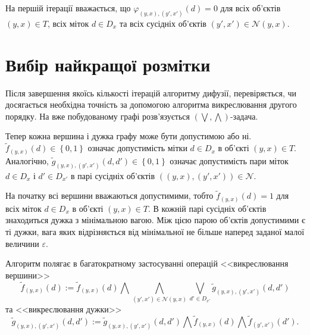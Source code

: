 На першій ітерації вважається, що
$\varphi_{\left(y, x \right), \left(y', x' \right)} \left(d \right) = 0$
для всіх об'єктів $\left(y, x \right) \in T$, всіх міток $d \in D_x$
та всіх сусідніх об'єктів
$\left(y', x' \right) \in \mathcal{N} \left(y, x \right)$.

\section{Вибір найкращої розмітки}


Після завершення якоїсь кількості ітерацій алгоритму дифузії,
перевіряється, чи досягається необхідна точність за допомогою
алгоритма викреслювання другого порядку.
На вже побудованому графі розв'язується
$\left( \bigvee, \bigwedge \right)$-задача.


Тепер кожна вершина і дужка графу може бути допустимою або ні.
$\tilde{f}_{\left(y, x \right)} \left(d \right) \in \left\{ 0, 1 \right\}$
означає допустимість мітки
$d \in D_x$ в об'єкті $\left(y,x \right) \in T$.
Аналогічно,
$\tilde{g}_{\left(y,x \right), \left(y', x' \right)} \left(d, d' \right)
    \in \left\{ 0, 1 \right\}$
означає допустимість пари міток $d \in D_x$ і $d' \in D_{x'}$
в парі сусідніх об'єктів
$\left( \left(y,x \right), \left(y', x' \right) \right) \in \mathcal{N}$.

На початку всі вершини вважаються допустимими, тобто
$\tilde{f}_{\left(y, x \right)} \left(d \right) = 1$ для всіх
міток $d \in D_x$ в об'єкті $\left(y,x \right) \in T$.
В кожній парі сусідніх об'єктів знаходиться дужка з мінімальною вагою.
Між цією парою об'єктів допустимими є ті дужки,
вага яких відрізняється від мінімальної не більше
наперед заданої малої величини $\varepsilon$.

Алгоритм полягає в багатократному застосуванні операцій
<<викреслювання вершини>>
\begin{equation*}
    \tilde{f}_{\left(y, x \right)} \left(d \right)
    := \tilde{f}_{\left(y, x \right)} \left(d \right)
    \bigwedge \bigwedge \limits_{\left(y', x' \right)\in \mathcal{N}\left(y,x \right)}
        \bigvee \limits_{d' \in D_{x'}}
            \tilde{g}_{\left(y,x \right), \left(y', x' \right)}
                \left(d, d' \right)
\end{equation*}
та <<викреслювання дужки>>
\begin{equation*}
    \tilde{g}_{\left(y,x \right), \left(y', x' \right)} \left(d, d' \right)
    := \tilde{g}_{\left(y,x \right), \left(y', x' \right)} \left(d, d' \right)
    \bigwedge \tilde{f}_{\left(y, x \right)} \left(d \right)
    \bigwedge \tilde{f}_{\left(y', x' \right)} \left(d' \right).
\end{equation*}

